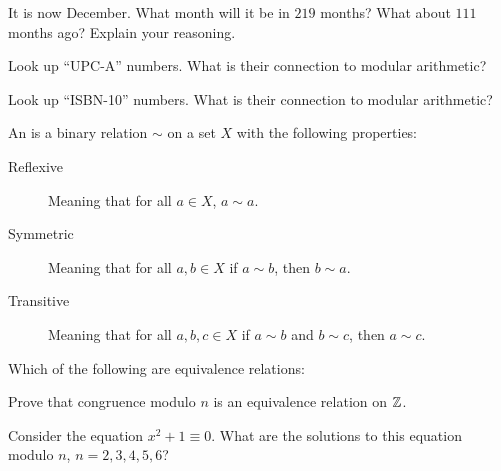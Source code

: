 \documentclass{ximera}
\begin{document}
\begin{exercise}
  It is now December. What month will it be in $219$ months? What about
  $111$ months ago? Explain your reasoning.
\end{exercise}


\begin{exercise}
  Look up ``UPC-A'' numbers. What is their connection to modular
  arithmetic?
\end{exercise}


\begin{exercise}
  Look up ``ISBN-10'' numbers. What is their connection to modular
  arithmetic?
\end{exercise}

\begin{definition}
  An  is a binary relation $\sim$ on a set
  $X$ with the following properties:
  \begin{description}
  \item[Reflexive] Meaning that for all $a\in X$, $a\sim a$.
  \item[Symmetric] Meaning that for all $a,b\in X$ if $a\sim b$, then
    $b\sim a$.
  \item[Transitive] Meaning that for all $a,b,c\in X$ if $a\sim b$ and
    $b \sim c$, then $a\sim c$.
  \end{description}
\end{definition}


\begin{exercise}
  Which of the following are equivalence relations:
  \begin{selectAll}
  \end{selectAll}
\end{exercise}


\begin{exercise}
  Prove that congruence modulo $n$ is an equivalence relation on $\mathbb Z$.
\end{exercise}


\begin{exercise}
  Consider the equation $x^2+1 \equiv 0$. What are the solutions to this
  equation modulo $n$, $n=2,3,4,5,6$?
\end{exercise}
\end{document}
